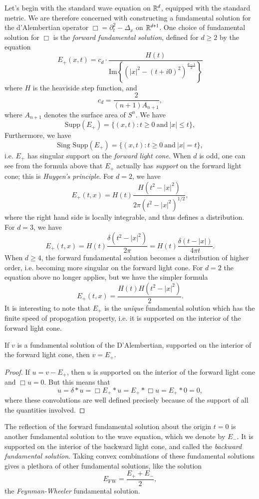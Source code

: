 Let's begin with the standard wave equation on $\operatorname{\mathbb{R}}^d$, equipped with the standard metric. We are therefore concerned with constructing a fundamental solution for the d'Alembertian operator $\Box = \partial_t^2 - \Delta_x$ on $\operatorname{\mathbb{R}}^{d + 1}$. One choice of fundamental solution for $\Box$ is the \emph{forward fundamental solution}, defined for $d \geq 2$ by the equation
%
\[ E_+(x,t) = c_d \cdot \frac{H(t)}{\text{Im} \left\{ (|x|^2 - (t + i0)^2)^{\frac{d-1}{2}} \right\}} \]
%
where $H$ is the heaviside step function, and
%
\[ c_d = \frac{2}{(n+1) A_{n+1}}, \]
%
where $A_{n+1}$ denotes the surface area of $S^n$. We have
%
\[ \text{Supp}(E_+) = \{ (x,t): t \geq 0\ \text{and}\ |x| \leq t \}, \]
%
Furthermore, we have
%
\[ \text{Sing\ Supp}(E_+) = \{ (x,t): t \geq 0\ \text{and}\ |x| = t \}, \]
%
i.e. $E_+$ has singular support on the \emph{forward light cone}. When $d$ is odd, one can see from the formula above that $E_+$ actually has \emph{support} on the forward light cone; this is \emph{Huygen's principle}. For $d = 2$, we have
%
\[ E_+(t,x) = H(t) \frac{H(t^2 - |x|^2)}{2 \pi (t^2 - |x|^2)^{1/2}}, \]
%
where the right hand side is locally integrable, and thus defines a distribution. For $d = 3$, we have
%
\[ E_+(t,x) = H(t) \frac{\delta(t^2 - |x|^2)}{2 \pi} = H(t) \frac{\delta(t - |x|)}{4 \pi t}. \]
%
When $d \geq 4$, the forward fundamental solution becomes a distribution of higher order, i.e. becoming more singular on the forward light cone. For $d = 2$ the equation above no longer applies, but we have the simpler formula
%
\[ E_+(t,x) = \frac{H(t) H(t^2 - |x|^2)}{2}. \]
%
It is interesting to note that $E_+$ is the \emph{unique} fundamental solution which has the finite speed of propogation property, i.e. it is supported on the interior of the forward light cone.

\begin{lemma}
    If $v$ is a fundamental solution of the D'Alembertian, supported on the interior of the forward light cone, then $v = E_+$.
\end{lemma}
\begin{proof}
    If $u = v - E_+$, then $u$ is supported on the interior of the forward light cone and $\Box u = 0$. But this means that
    \[ u = \delta * u = \Box E_+ * u = E_+ * \Box u = E_+ * 0 = 0, \]
    where these convolutions are well defined precisely because of the support of all the quantities involved.
\end{proof}

The reflection of the forward fundamental solution about the origin $t = 0$ is another fundamental solution to the wave equation, which we denote by $E_-$. It is supported on the interior of the backward light cone, and called the \emph{backward fundamental solution}. Taking convex combinations of these fundamental solutions gives a plethora of other fundamental solutions, like the solution
%
\[ E_{\text{FW}} = \frac{E_+ + E_-}{2}, \]
%
the \emph{Feynman-Wheeler} fundamental solution.

